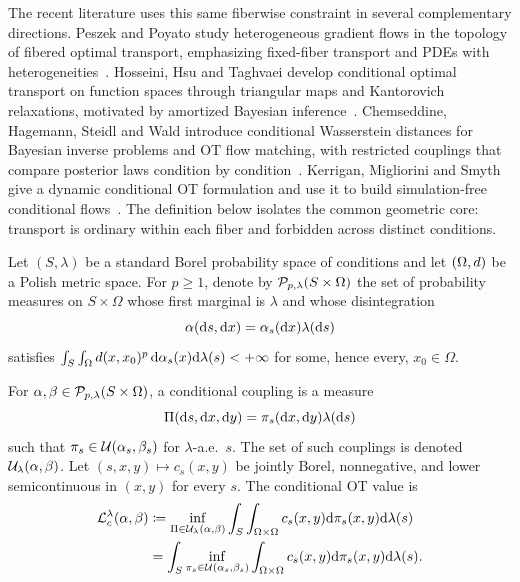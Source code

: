 The recent literature uses this same fiberwise constraint in several complementary directions. Peszek and Poyato study heterogeneous gradient flows in the topology of fibered optimal transport, emphasizing fixed-fiber transport and PDEs with heterogeneities~\cite{PeszekPoyato2023FiberedOptimalTransport}. Hosseini, Hsu and Taghvaei develop conditional optimal transport on function spaces through triangular maps and Kantorovich relaxations, motivated by amortized Bayesian inference~\cite{HosseiniHsuTaghvaei2023ConditionalFunctionSpaces}. Chemseddine, Hagemann, Steidl and Wald introduce conditional Wasserstein distances for Bayesian inverse problems and OT flow matching, with restricted couplings that compare posterior laws condition by condition~\cite{ChemseddineHagemannSteidlWald2024ConditionalWasserstein}. Kerrigan, Migliorini and Smyth give a dynamic conditional OT formulation and use it to build simulation-free conditional flows~\cite{KerriganMiglioriniSmyth2024DynamicConditionalOT}. The definition below isolates the common geometric core: transport is ordinary within each fiber and forbidden across distinct conditions.

\begin{defn}\label{def-conditional-ot}
	Let $(S,\lambda)$ be a standard Borel probability space of conditions and let $(\Omega,d)$ be a Polish metric space. For $p\geq1$, denote by $\mathcal{P}_{p,\lambda}(S\times\Omega)$ the set of probability measures on $S\times\Omega$ whose first marginal is $\lambda$ and whose disintegration
	\[
		\alpha(\mathrm{d} s,\mathrm{d} x)=\alpha_s(\mathrm{d} x)\lambda(\mathrm{d} s)
	\]
	satisfies $\int_S\int_\Omega d(x,x_0)^p\,\mathrm{d}\alpha_s(x)\mathrm{d}\lambda(s)<+\infty$ for some, hence every, $x_0\in\Omega$.

	For $\alpha,\beta\in\mathcal{P}_{p,\lambda}(S\times\Omega)$, a conditional coupling is a measure
	\[
		\Pi(\mathrm{d} s,\mathrm{d} x,\mathrm{d} y)
		=
		\pi_s(\mathrm{d} x,\mathrm{d} y)\lambda(\mathrm{d} s)
	\]
	such that $\pi_s\in\mathcal{U}(\alpha_s,\beta_s)$ for $\lambda$-a.e.\ $s$. The set of such couplings is denoted $\mathcal{U}_\lambda(\alpha,\beta)$.
	Let $(s,x,y)\mapsto c_s(x,y)$ be jointly Borel, nonnegative, and lower semicontinuous in $(x,y)$ for every $s$. The conditional OT value is
	\begin{equation}\label{eq-conditional-ot-general}
		\begin{aligned}
		\mathcal{L}_c^\lambda(\alpha,\beta)
		&\coloneqq
		\inf_{\Pi\in\mathcal{U}_\lambda(\alpha,\beta)}
		\int_S\int_{\Omega\times\Omega} c_s(x,y)\mathrm{d}\pi_s(x,y)\mathrm{d}\lambda(s) \\
		&=
		\int_S
		\inf_{\pi_s\in\mathcal{U}(\alpha_s,\beta_s)}
		\int_{\Omega\times\Omega} c_s(x,y)\mathrm{d}\pi_s(x,y)
		\mathrm{d}\lambda(s).
		\end{aligned}
	\end{equation}
\end{defn}

